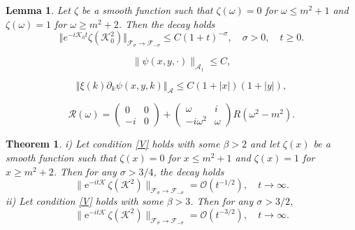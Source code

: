 \documentclass[10pt,a4paper]{amsart}
\newtheorem{lemma}{Lemma}
\newtheorem{theorem}{Theorem}
\newcommand{\E}{\mathrm{e}}
\newcommand{\cF}{{\mathcal F}}
\newcommand{\cK}{{\mathcal K}}
\newcommand{\cR}{{\mathcal R}}
\begin{document}
\begin{lemma}\label{lem2} 
Let $\zeta$  be a smooth function such that $\zeta(\omega)=0$ for $\omega\le m^2+1$ and
$\zeta(\omega)=1$ for $\omega\geq m^2 + 2$. Then the decay holds
\begin{equation}\label{WD3}
\Vert  e^{-i \cK_0t} \zeta(\cK_0^2)\Vert_{{\cF}_{\sigma}\to {\cF}_{-\sigma}}
\le C (1+t)^{-\sigma},\quad\sigma>0,\quad t\ge 0.
\end{equation}
\end{lemma}

\begin{equation}\label{thh}
\| \psi(x,y, \cdot)\|_{\mathcal{A}_1} \le C,
\end{equation}

\begin{equation}\label{psi-est}
\Vert \xi(k)\partial_k\psi(x,y,k)\Vert_{\mathcal A}\le C(1+|x|)(1+|y|),
\end{equation}

\begin{equation}\label{R}
 \cR(\omega)=
   \begin{pmatrix}
 0            &  0\\
  -i          &  0
\end{pmatrix}
+
\begin{pmatrix}
 \omega &  i \\
  -i \omega^2&  \omega
\end{pmatrix} R(\omega^2-m^2).
\end{equation}

\begin{theorem}\label{thKG3}
i) Let condition \eqref{V} holds with some $\beta>2$ and let  $\zeta(x)$ be a smooth function such that $\zeta(x)=0$ for $x\le m^2+1$ and
$\zeta(x)=1$ for $x\geq m^2 + 2$.
Then  for any $\sigma>3/4$, the decay holds  
\begin{equation}\label{b1}
\big\|\E^{-it\cK}\,\zeta(\cK^2)\big\|_{{\mathcal F}_\sigma\to {\mathcal F}_{-\sigma}}
={\mathcal O}(t^{-1/2}),\quad t\to \infty.
\end{equation}
ii)
Let condition \eqref{V} holds with some $\beta>3$.  Then for any $\sigma>3/2$,
\begin{equation}\label{b2}
\big\|\E^{-it\cK}\,\zeta(\cK^2)\big\|_{{\mathcal F}_\sigma\to {\mathcal F}_{-\sigma}}
={\mathcal O}(t^{-3/2}),\quad t\to \infty.
\end{equation}
\end{theorem}
\end{document}
